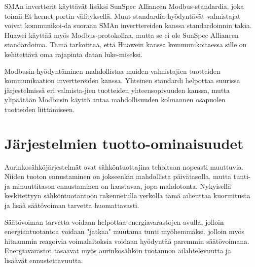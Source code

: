   SMAn invertterit käyttävät lisäksi SunSpec Alliancen Modbus-standardia, joka toimii Et-hernet-portin välityksellä. Muut standardia hyödyntävät valmistajat voivat kommunikoi-da suoraan SMAn inverttereiden kanssa standardoinnin takia. Huawei käyttää myös Modbus-protokollaa, mutta se ei ole SunSpec Alliancen standardoima. Tämä tarkoittaa, että Huawein kanssa kommunikoitaessa sille on kehitettävä oma rajapinta datan luke-miseksi.

  Modbusin hyödyntäminen mahdollistaa muiden valmistajien tuotteiden kommunikaation inverttereiden kanssa. Yhteinen standardi helpottaa suurissa järjestelmissä eri valmista-jien tuotteiden yhteensopivuuden kanssa, mutta ylipäätään Modbusin käyttö antaa mahdollisuuden kolmannen osapuolen tuotteiden liittämiseen. 

\section{Järjestelmien tuotto-ominaisuudet}
  Aurinkosähköjärjestelmät ovat sähköntuottajina teholtaan nopeasti muuttuvia. Niiden tuoton ennustaminen on jokseenkin mahdollista päivätasolla, mutta tunti- ja minuuttitason ennustaminen on haastavaa, jopa mahdotonta. Nykyisellä keskitettyyn sähköntuotantoon rakennetulla verkolla tämä aiheuttaa kuormitusta ja lisää säätövoiman tarvetta huomattavasti. 
  
  Säätövoiman tarvetta voidaan helpottaa energiavarastojen avulla, jolloin energiantuotantoa voidaan "jatkaa" muutama tunti myöhemmäksi, jolloin myös hitaammin reagoivia voimalaitoksia voidaan hyödyntää paremmin säätövoimana. Energiavarastot tasaavat myös aurinkosähkön tuotannon ailahtelevuutta ja lisäävät ennustettavuutta. 